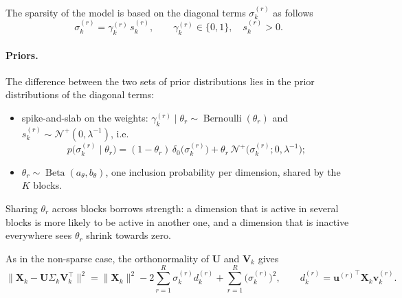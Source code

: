 \documentclass[11pt]{article}
\DeclareMathOperator{\Bern}{Bernoulli}
\DeclareMathOperator{\Be}{Beta}
\newcommand{\X}{\mathbf{X}}
\newcommand{\U}{\mathbf{U}}
\newcommand{\V}{\mathbf{V}}
\newcommand{\uu}{\mathbf{u}}
\newcommand{\vv}{\mathbf{v}}
\begin{document}
The sparsity of the model is based on the diagonal terms $\sigma_k^{(r)}$ as follows
\begin{equation}
  \sigma_k^{(r)}=\gamma_k^{(r)}\,s_k^{(r)},\qquad \gamma_k^{(r)}\in\{0,1\},\quad s_k^{(r)}>0 .
  \label{eq:spike}
\end{equation}

\paragraph{Priors.} The difference between the two sets of prior distributions lies in the prior distributions of the diagonal terms: 
\begin{itemize}
  \item spike-and-slab on the weights:
        $\gamma_k^{(r)}\mid\theta_r\sim\Bern(\theta_r)$ and $s_k^{(r)}\sim\mathcal N^+(0,\lambda^{-1})$, i.e.\
        \[
          p\bigl(\sigma_k^{(r)}\mid\theta_r\bigr)=(1-\theta_r)\,\delta_0\bigl(\sigma_k^{(r)}\bigr)+\theta_r\,\mathcal N^+\bigl(\sigma_k^{(r)};0,\lambda^{-1}\bigr);
        \]
  \item $\theta_r\sim\Be(a_\theta,b_\theta)$, one inclusion probability per dimension, shared by the $K$ blocks.
\end{itemize}
Sharing $\theta_r$ across blocks borrows strength: a dimension that is active in several blocks is more likely
to be active in another one, and a dimension that is inactive everywhere sees $\theta_r$ shrink towards zero.

As in the non-sparse case, the orthonormality of $\U$ and $\V_k$ gives
\begin{equation}
  \bigl\|\X_k-\U\Sigma_k\V_k^\intercal\bigr\|^2=\|\X_k\|^2-2\sum_{r=1}^R\sigma_k^{(r)}d_k^{(r)}+\sum_{r=1}^R\bigl(\sigma_k^{(r)}\bigr)^2,
  \qquad d_k^{(r)}={\uu^{(r)}}^\intercal\X_k\vv_k^{(r)} .
  \label{eq:expand2}
\end{equation}
\end{document}
